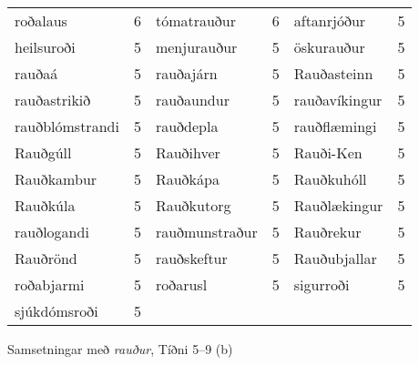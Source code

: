 \documentclass[../samsetningasafn.tex]{subfiles}
\begin{document}
\begin{wordlist}[H]
\begin{tcolorbox}
\begin{tabular}{BlBlBl}
		roðalaus			& 6		& 	
		tómatrauður		& 6		& 	
		aftanrjóður		& 5		\\ 	%
		heilsuroði		& 5		& 	
		menjurauður		& 5		& 
		öskurauður		& 5		\\ 	%
		rauðaá			& 5		& 	
		rauðajárn		& 5		& 	
		Rauðasteinn		& 5		\\  %
		rauðastrikið		& 5		& 	
		rauðaundur		& 5		& 	
		rauðavíkingur	& 5		\\  %
		rauðblómstrandi	& 5		& 	
		rauðdepla		& 5		& 	
		rauðflæmingi		& 5		\\  %
		Rauðgúll			& 5		& 	
		Rauðihver		& 5		& 	
		Rauði-Ken		& 5		\\ 	%
		Rauðkambur		& 5		& 	
		Rauðkápa		& 5		& 	
		Rauðkuhóll		& 5		\\ 	%
		Rauðkúla		& 5		& 	
		Rauðkutorg		& 5		& 	
		Rauðlækingur	& 5		\\ 	%
		rauðlogandi		& 5		& 
		rauðmunstraður	& 5		& 	
		Rauðrekur		& 5		\\  %
		Rauðrönd		& 5		& 	
		rauðskeftur		& 5		& 		
		Rauðubjallar		& 5		\\  %
		roðabjarmi		& 5		& 	
		roðarusl			& 5		& 	
		sigurroði			& 5		\\  %
		sjúkdómsroði	& 5		& 
						&		&
						&
	\end{tabular}
\end{tcolorbox}
	\caption{Samsetningar með \textit{rauður}, Tíðni 5--9 (b)}
	\label{listi:rautt.5b}
\end{wordlist}					
\end{document}

